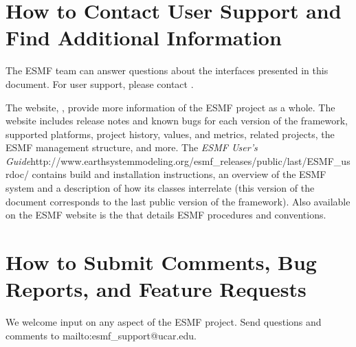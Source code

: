 \section{How to Contact User Support and Find Additional Information}
\label{sec:Support}
The ESMF team can answer questions about the interfaces presented in this 
document.  For user support, please contact 
.  

The website, , provide more information of the ESMF project as a whole.
The website includes release notes and known bugs for each version of the
framework, supported platforms, project history, values, and metrics, related projects,
the ESMF management structure, and more.  The \htmladdnormallink
{{\it ESMF User's Guide}}{http://www.earthsystemmodeling.org/esmf\_releases/public/last/ESMF\_usrdoc/} contains build and installation instructions, an overview of the ESMF system and a description of 
how its classes interrelate (this version of the document corresponds to the last public version of the framework).  Also available on the ESMF website is the 
that details ESMF procedures and conventions.  
 
\section{How to Submit Comments, Bug Reports, and Feature Requests}
\label{sec:Submission}
\begin{sloppypar}
We welcome input on any aspect of the ESMF project.  Send
questions and comments to 
{mailto:esmf\_support@ucar.edu}.
\end{sloppypar}






